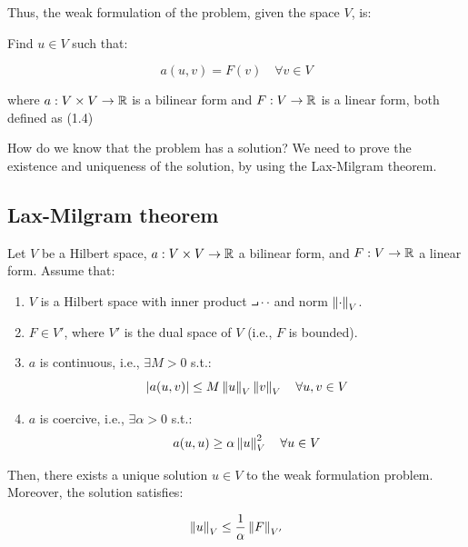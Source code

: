 Thus, the weak formulation of the problem, given the space $V$, is:

\begin{fdefinition}
    Find $u \in V$ such that:

    $$a(u, v) = F(v) \quad \forall v \in V$$

    where $a: V \times V\to \mathbb{R}$ is a bilinear form and 
    $F: V \to \mathbb{R}$ is a linear form, both defined as (1.4)
\end{fdefinition}

How do we know that the problem has a solution? We need to prove the existence and uniqueness of the solution,
by using the Lax-Milgram theorem.

\subsection{Lax-Milgram theorem}

\begin{ftheorem}
    Let $V$ be a Hilbert space, $a: V \times V \to \mathbb{R}$ a bilinear form, and $F: V \to \mathbb{R}$ a linear form.
    Assume that:

    \vspace{1em}
    \begin{enumerate}[label=(\roman*)]
        \item $V$ is a Hilbert space with inner product $\intprod{\cdot}{\cdot}$ and norm $\left\|\cdot\right\|_V$.
        
        \vspace{1em}

        \item $F \in V'$, where $V'$ is the dual space of $V$ (i.e., $F$ is bounded).
        
        \vspace{1em}

        \item $a$ is continuous, i.e., $\exists M > 0$ s.t.:
            $$|a(u, v)| \leq M \left\|u\right\|_V \left\|v\right\|_V \quad \forall u, v \in V$$

        \item $a$ is coercive, i.e., $\exists \alpha > 0$ s.t.:
            $$a(u, u) \geq \alpha \left\|u\right\|_V^2 \quad \forall u \in V$$
            
    \end{enumerate}

    Then, there exists a unique solution $u \in V$ to the weak formulation problem. Moreover, the solution satisfies:

    $$\left\|u\right\|_V \leq \frac{1}{\alpha} \left\|F\right\|_{V'}$$

\end{ftheorem}

